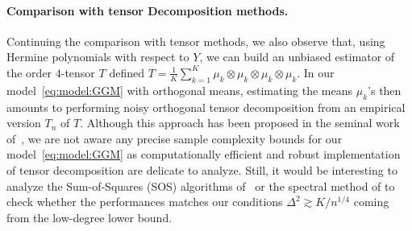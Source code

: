 \documentclass{article}
\begin{document}
\paragraph{Comparison with tensor Decomposition methods.} Continuing the comparison with tensor methods, we also observe that, using Hermine polynomials with respect to $Y$, we can build an unbiased estimator of the  order $4$-tensor $T$ defined $T=\frac{1}{K}\sum_{k=1}^K \mu_k\otimes \mu_k\otimes \mu_k\otimes \mu_k$.  In our model~\eqref{eq:model:GGM} with orthogonal means, estimating the means $\mu_k$'s then amounts to performing noisy orthogonal tensor decomposition from an empirical version $T_n$ of $T$. Although this approach has been proposed in the seminal work of~\cite{anandkumar2014tensor}, we are not aware any precise sample complexity bounds for our model~\ref{eq:model:GGM} as computationally efficient and robust implementation of tensor decomposition are delicate to analyze. Still, it would be interesting to analyze the Sum-of-Squares (SOS) algorithms of~\cite{ma2016polynomial} or the spectral method of \cite{hopkins2019robust} to check whether the performances matches our conditions $\Delta^2\gtrsim K/n^{1/4}$ coming from the low-degree lower bound. 


    
    
    
\end{document}
